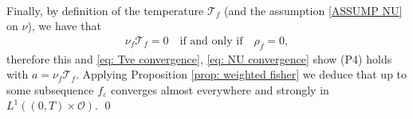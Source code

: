 \documentclass[10pt, reqno]{amsart}
\theoremstyle{plain}
\theoremstyle{definition}
\theoremstyle{remark}
\renewenvironment{proof}[1][\proofname]{\noindent{\scshape #1.\quad}}{\qed}
\numberwithin{equation}{section}
\newcommand{\calO}{\mathcal O}
\newcommand{\calT}{\mathcal T}
\newcommand{\ve}{\varepsilon}
\begin{document}
\begin{proof}
\begin{align}
    \end{align}
    Finally, by definition of the temperature $\calT_f$ (and the assumption \eqref{ASSUMP NU} on $\nu$), we have that
    \begin{align*}
        \nu_f \calT_f = 0 \quad \text{if and only if}\quad \rho_f = 0,
    \end{align*}
    therefore this and \eqref{eq: Tve convergence}, \eqref{eq: NU convergence} show (P4) holds with $a = \nu_f \calT_f$. Applying Proposition \ref{prop: weighted fisher} we deduce that up to some subsequence $f_\ve$ converges almost everywhere and strongly in $L^1((0,T)\times \calO)$.
\end{proof}



\end{document}
